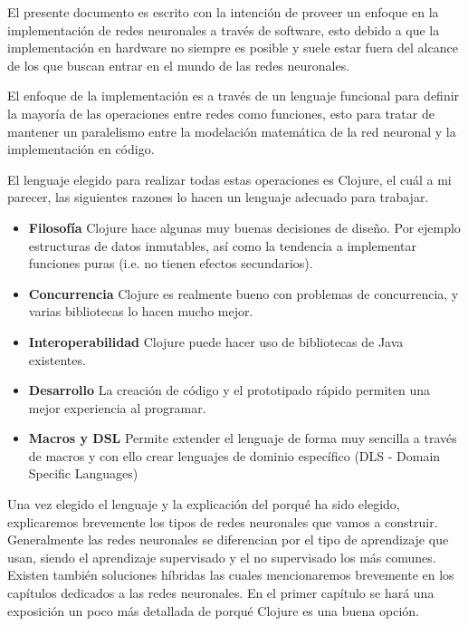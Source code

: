 \begin{prefacio}

  El presente documento es escrito con la intención de proveer un
  enfoque en la implementación de redes neuronales a través de
  software, esto debido a que la implementación en hardware no siempre
  es posible y suele estar fuera del alcance de los que buscan entrar
  en el mundo de las redes neuronales.

  El enfoque de la implementación es a través de un lenguaje funcional
  para definir la mayoría de las operaciones entre redes como
  funciones, esto para tratar de mantener un paralelismo entre la
  modelación matemática de la red neuronal y la implementación en
  código.

  El lenguaje elegido para realizar todas estas operaciones es
  Clojure, el cuál a mi parecer, las siguientes razones lo hacen un
  lenguaje adecuado para trabajar.

  \begin{itemize}
  \item \textbf{Filosofía} Clojure hace algunas muy buenas decisiones de
    diseño. Por ejemplo estructuras de datos inmutables, así como la
    tendencia a implementar funciones puras (i.e. no tienen efectos
    secundarios).
  \item \textbf{Concurrencia} Clojure es realmente bueno con problemas de
    concurrencia, y varias bibliotecas lo hacen mucho mejor.
  \item \textbf{Interoperabilidad} Clojure puede hacer uso de bibliotecas de
    Java existentes.
  \item \textbf{Desarrollo} La creación de código y el prototipado rápido
    permiten una mejor experiencia al programar.
  \item \textbf{Macros y DSL} Permite extender el lenguaje de forma muy
    sencilla a través de macros y con ello crear lenguajes de dominio
    específico (DLS - Domain Specific Languages)
  \end{itemize}

  Una vez elegido el lenguaje y la explicación del porqué ha sido
  elegido, explicaremos brevemente los tipos de redes neuronales que
  vamos a construir. Generalmente las redes neuronales se diferencian
  por el tipo de aprendizaje que usan, siendo el aprendizaje
  supervisado y el no supervisado los más comunes. Existen también
  soluciones híbridas las cuales mencionaremos brevemente en los
  capítulos dedicados a las redes neuronales. En el primer capítulo se
  hará una exposición un poco más detallada de porqué Clojure es una
  buena opción.


\end{prefacio}
